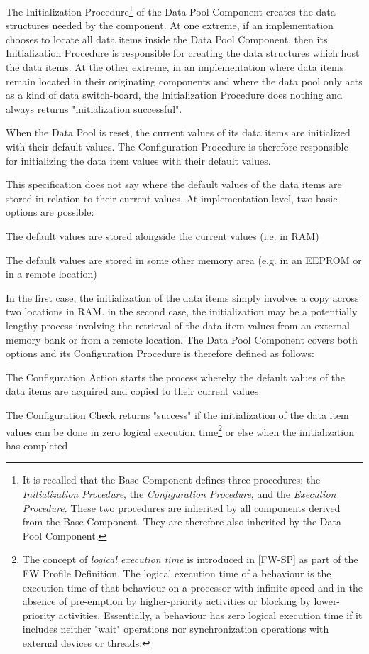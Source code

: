 \documentclass{pnp_article}
\begin{document}
The Initialization Procedure\footnote{It is recalled that the Base Component defines three procedures: the \textit{Initialization Procedure}, the \textit{Configuration Procedure}, and the \textit{Execution Procedure}. These two procedures are inherited by all components derived from the Base Component. They are therefore also inherited by the Data Pool Component.} of the Data Pool Component creates the data structures needed by the component. At one extreme, if an implementation chooses to locate all data items inside the Data Pool Component, then its Initialization Procedure is responsible for creating the data structures which host the data items. At the other extreme, in an implementation where data items remain located in their originating components and where the data pool only acts as a kind of data switch-board, the Initialization Procedure does nothing and always returns "initialization successful".

When the Data Pool is reset, the current values of its data items are initialized with their default values. The Configuration Procedure is therefore responsible for initializing the data item values with their default values. 

This specification does not say where the default values of the data items are stored in relation to their current values. At implementation level, two basic options are possible:

\begin{fw_enumerate}
\item The default values are stored alongside the current values (i.e. in RAM)
\item The default values are stored in some other memory area (e.g. in an EEPROM or in a remote location)
\end{fw_enumerate}

In the first case, the initialization of the data items simply involves a copy across two locations in RAM. in the second case, the initialization may be a potentially lengthy process involving the retrieval of the data item values from an external memory bank or from a remote location. The Data Pool Component covers both options and its Configuration Procedure is therefore defined as follows:

\begin{fw_itemize}
\item The Configuration Action starts the process whereby the default values of the data items are acquired and copied to their current values
\item The Configuration Check returns "success" if the initialization of the data item values can be done in zero logical execution time\footnote{The concept of \textit{logical execution time} is introduced in [FW-SP] as part of the FW Profile Definition. The logical execution time of a behaviour is the execution time of that behaviour on a processor with infinite speed and in the absence of pre-emption by higher-priority activities or blocking by lower-priority activities. Essentially, a behaviour has zero logical execution time if it includes neither "wait" operations nor synchronization operations with external devices or threads.} or else when the initialization has completed 
\end{fw_itemize}
\end{document}
